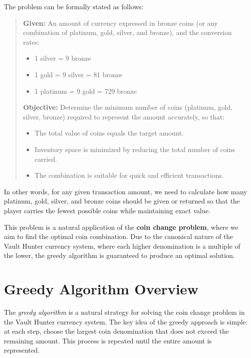 \documentclass[12pt,a4paper]{report}
\begin{document}
The problem can be formally stated as follows:

\begin{quote}
\textbf{Given:} An amount of currency expressed in bronze coins (or any combination of platinum, gold, silver, and bronze), and the conversion rates:
\begin{itemize}
    \item 1 silver = 9 bronze
    \item 1 gold = 9 silver = 81 bronze
    \item 1 platinum = 9 gold = 729 bronze
\end{itemize}

\textbf{Objective:} Determine the minimum number of coins (platinum, gold, silver, bronze) required to represent the amount accurately, so that:
\begin{itemize}
    \item The total value of coins equals the target amount.
    \item Inventory space is minimized by reducing the total number of coins carried.
    \item The combination is suitable for quick and efficient transactions.
\end{itemize}
\end{quote}

\noindent In other words, for any given transaction amount, we need to calculate how many platinum, gold, silver, and bronze coins should be given or returned so that the player carries the fewest possible coins while maintaining exact value.  

This problem is a natural application of the \textbf{coin change problem}, where we aim to find the optimal coin combination. Due to the canonical nature of the Vault Hunter currency system, where each higher denomination is a multiple of the lower, the greedy algorithm is guaranteed to produce an optimal solution.

\section{Greedy Algorithm Overview}

The \textit{greedy algorithm} is a natural strategy for solving the coin change problem in the Vault Hunter currency system. The key idea of the greedy approach is simple: at each step, choose the largest coin denomination that does not exceed the remaining amount. This process is repeated until the entire amount is represented.  
\end{document}
